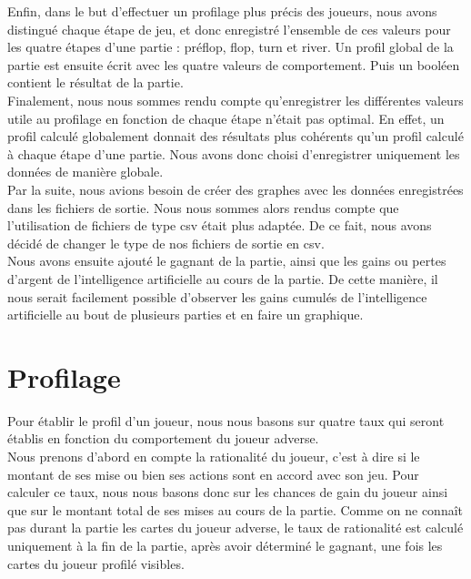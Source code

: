 \documentclass{report}
\begin{document}
Enfin, dans le but d'effectuer un profilage plus précis des joueurs, nous avons distingué chaque étape de jeu, et donc enregistré l'ensemble de ces valeurs pour les quatre étapes d'une partie : préflop, flop, turn et river. Un profil global de la partie est ensuite écrit avec les quatre valeurs de comportement. Puis un booléen contient le résultat de la partie.\\

Finalement, nous nous sommes rendu compte qu'enregistrer les différentes valeurs utile au profilage en fonction de chaque étape n'était pas optimal. En effet, un profil calculé globalement donnait des résultats plus cohérents qu'un profil calculé à chaque étape d'une partie. Nous avons donc choisi d'enregistrer uniquement les données de manière globale.\\


Par la suite, nous avions besoin de créer des graphes avec les données enregistrées dans les fichiers de sortie. Nous nous sommes alors rendus compte que l'utilisation de fichiers de type csv était plus adaptée. De ce fait, nous avons décidé de changer le type de nos fichiers de sortie en csv.\\

Nous avons ensuite ajouté le gagnant de la partie, ainsi que les gains ou pertes d'argent de l'intelligence artificielle au cours de la partie. De cette manière, il nous serait facilement possible d'observer les gains cumulés de l'intelligence artificielle au bout de plusieurs parties et en faire un graphique.\par


\section{Profilage}
\hspace{0.5cm}Pour établir le profil d'un joueur, nous nous basons sur quatre taux qui seront établis en fonction du comportement du joueur adverse.\\

Nous prenons d'abord en compte la rationalité du joueur, c'est à dire si le montant de ses mise ou bien ses actions sont en accord avec son jeu. Pour calculer ce taux, nous nous basons donc sur les chances de gain du joueur ainsi que sur le montant total de ses mises au cours de la partie. Comme on ne connaît pas durant la partie les cartes du joueur adverse, le taux de rationalité est calculé uniquement à la fin de la partie, après avoir déterminé le gagnant, une fois les cartes du joueur profilé visibles.\\
\end{document}
